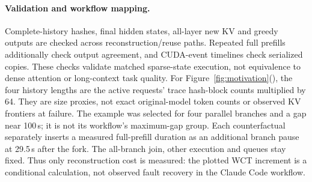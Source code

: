 \documentclass[sigplan,10pt,anonymous,nonacm]{acmart}
\begin{document}
\paragraph{Validation and workflow mapping.}
Complete-history hashes, final hidden states, all-layer new KV and greedy
outputs are checked across reconstruction/reuse paths. Repeated full
prefills additionally check output agreement, and CUDA-event timelines
check serialized copies. These checks validate matched sparse-state
execution, not equivalence to dense attention or long-context task quality.
For Figure~\ref{fig:motivation}(), the four history lengths
are the active requests' trace hash-block counts multiplied by 64.
They are size proxies, not exact original-model token counts or observed
KV frontiers at failure. The example was selected for four parallel
branches and a gap near 100\,s; it is not its workflow's maximum-gap group.
Each counterfactual separately inserts a measured full-prefill duration
as an additional branch pause at 29.5\,s after the fork. The all-branch
join, other execution and queues stay fixed. Thus only reconstruction
cost is measured: the plotted WCT increment is a conditional calculation,
not observed fault recovery in the Claude Code workflow.
\end{document}
